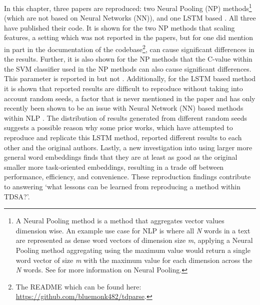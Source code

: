 In this chapter, three papers are reproduced: two Neural Pooling (NP) methods\footnote{A Neural Pooling method is a method that aggregates vector values dimension wise. An example use case for NLP is where all \textit{N} words in a text are represented as dense word vectors of dimension size \textit{m}, applying a Neural Pooling method aggregating using the maximum value would return a single word vector of size \textit{m} with the maximum value for each dimension across the \textit{N} words. See \citet{vo2015target} for more information on Neural Pooling.} \citep{vo2015target, wang-etal-2017-tdparse} (which are not based on Neural Networks (NN)), and one LSTM based \citep{tang-etal-2016-effective}. All three have published their code. It is shown for the two NP methods that scaling features, a setting which was not reported in the papers, but for one \citep{wang-etal-2017-tdparse} did mention in part in the documentation of the codebase\footnote{The README which can be found here: \url{https://github.com/bluemonk482/tdparse}.}, can cause significant differences in the results. Further, it is also shown for the NP methods that the C-value within the SVM classifier used in the NP methods can also cause significant differences. This parameter is reported in \citet{vo2015target} but not \citet{wang-etal-2017-tdparse}. Additionally, for the LSTM based method it is shown that reported results are difficult to reproduce without taking into account random seeds, a factor that is never mentioned in the paper and has only recently been shown to be an issue with Neural Network (NN) based methods within NLP \citep{reimers-gurevych-2017-reporting}. The distribution of results generated from different random seeds suggests a possible reason why some prior works, which have attempted to reproduce \citep{tay2018learning} and replicate \citep{chen-etal-2017-recurrent} this LSTM method, reported different results to each other and the original authors. Lastly, a new investigation into using larger more general word embeddings finds that they are at least as good as the original smaller more task-oriented embeddings, resulting in a trade off between performance, efficiency, and convenience. These reproduction findings contribute to answering  `what lessons can be learned from reproducing a method within TDSA?'.


